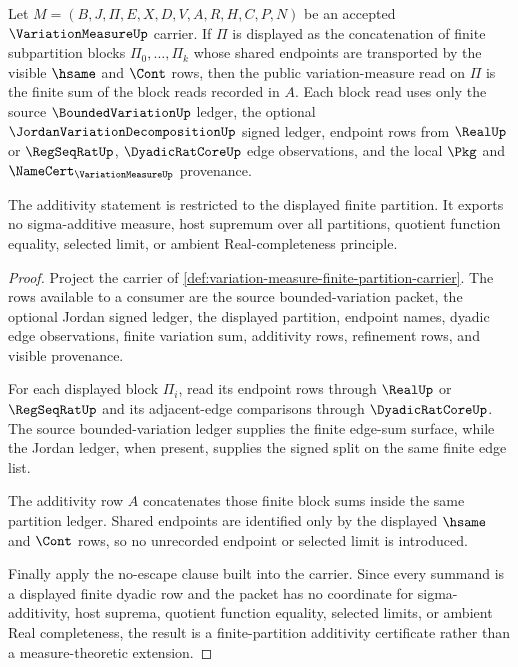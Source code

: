 \begin{theorem}
\label{thm:variation-measure-finite-partition-additivity}
Let $M=(B,J,\Pi,E,X,D,V,A,R,H,C,P,N)$ be an accepted $\VariationMeasureUp$ carrier. If $\Pi$ is displayed as the concatenation of finite subpartition blocks $\Pi_0,\ldots,\Pi_k$ whose shared endpoints are transported by the visible $\hsame$ and $\Cont$ rows, then the public variation-measure read on $\Pi$ is the finite sum of the block reads recorded in $A$. Each block read uses only the source $\BoundedVariationUp$ ledger, the optional $\JordanVariationDecompositionUp$ signed ledger, endpoint rows from $\RealUp$ or $\RegSeqRatUp$, $\DyadicRatCoreUp$ edge observations, and the local $\Pkg$ and $\NameCert_{\VariationMeasureUp}$ provenance.

The additivity statement is restricted to the displayed finite partition. It exports no sigma-additive measure, host supremum over all partitions, quotient function equality, selected limit, or ambient Real-completeness principle.
\end{theorem}
\begin{proof}
Project the carrier of \autoref{def:variation-measure-finite-partition-carrier}. The rows available to a consumer are the source bounded-variation packet, the optional Jordan signed ledger, the displayed partition, endpoint names, dyadic edge observations, finite variation sum, additivity rows, refinement rows, and visible provenance.

For each displayed block $\Pi_i$, read its endpoint rows through $\RealUp$ or $\RegSeqRatUp$ and its adjacent-edge comparisons through $\DyadicRatCoreUp$. The source bounded-variation ledger supplies the finite edge-sum surface, while the Jordan ledger, when present, supplies the signed split on the same finite edge list.

The additivity row $A$ concatenates those finite block sums inside the same partition ledger. Shared endpoints are identified only by the displayed $\hsame$ and $\Cont$ rows, so no unrecorded endpoint or selected limit is introduced.

Finally apply the no-escape clause built into the carrier. Since every summand is a displayed finite dyadic row and the packet has no coordinate for sigma-additivity, host suprema, quotient function equality, selected limits, or ambient Real completeness, the result is a finite-partition additivity certificate rather than a measure-theoretic extension.
\end{proof}

